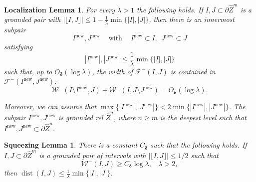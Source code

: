 \documentclass{amsart}
\renewcommand{\sp}{{\ \ }}
\newcommand{\1}{{\mathbb 1 }}
\newcommand{\Fam}{{\mathcal F}}
\newcommand{\Width}{{\mathcal W}}
\newcommand{\wZ}{{\widehat Z}}
\newcommand\new{{\operatorname{new}}}
\newtheorem{loclmm}[thm]{Localization Lemma}
\newtheorem{squeelmm}[thm]{Squeezing Lemma}
\theoremstyle{remark}
\numberwithin{equation}{section}
\theoremstyle{definition}
\newcommand{\dist}{\operatorname{dist}}
\newcommand{\bdelta}{{\boldsymbol{ \delta}}}
\begin{document}
\begin{loclmm}
\label{lem:trading  width to space}
For every $\lambda>1$ the following holds. If $I, J\subset \partial\wZ^m$ is a grounded pair  with $|\lfloor I, J\rfloor |\le 1 -\frac 1 \lambda \min\{|I|,|J|\}$, then there is an innermost subpair \[ I^\new,J^\new\sp\sp\text{ with }\sp\sp I^\new\subset I,\sp J^\new\subset J \] satisfying \[|I^\new|,|J^\new|\le \frac 1 \lambda \min\{|I|, |J|\}\] such that, up to $O_{\bdelta}(\log  \lambda)$, the width of $\Fam ^-(I,J)$ is contained in $\Fam^-(I^\new,J^\new)$:
\begin{equation}
\Width^- (I\setminus I^\new,J)+ \Width^-(I,J\setminus J^\new) =O_{\bdelta}(\log  \lambda).
\end{equation}

Moreover, we can assume that $\max\{|I^\new|, |J^\new|\} < 2 \min\{ |I^\new|, |J^\new|\}$. The subpair $ I^\new,J^\new$ is grounded rel $\wZ^n$, where $n\ge m$ is the deepest level such that $I^\new,J^\new\subset \partial \wZ^n$.
\end{loclmm}

\begin{squeelmm}
\label{lem:squeezing}
There is a constant $C_\bdelta$ such that the following holds. If $I,J\subset \partial \wZ^m$ is a grounded pair of intervals with $|\lfloor I, J\rfloor |\le 1/2$ such that \[\Width^-(I,J)\ge C_\bdelta \log \lambda, \sp\sp\lambda>2,\]
then $\dist (I,J) \le\frac{1}{\lambda} \min\{|I|,|J|\}$.
\end{squeelmm}
\end{document}
